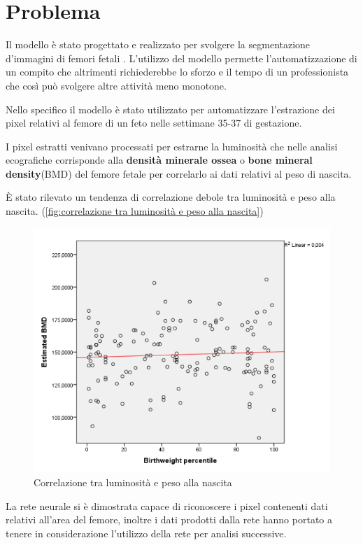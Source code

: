 
\section{Problema} %
\label{sec:Problema}

Il modello è stato progettato e realizzato per svolgere la segmentazione d'immagini di femori fetali \cite{abstract1} \cite{abstract2} .
L'utilizzo del modello permette l'automatizzazione di un compito che altrimenti richiederebbe lo sforzo e il tempo di un 
professionista che così può svolgere altre attività meno monotone.

Nello specifico il modello è stato utilizzato per automatizzare l'estrazione dei pixel relativi al femore di un feto 
nelle settimane 35-37 di gestazione. 

I pixel estratti venivano processati per estrarne la luminosità che nelle analisi ecografiche corrisponde 
alla \textbf{densità minerale ossea} o \textbf{bone mineral density}(BMD) del femore fetale
per correlarlo ai dati relativi al peso di nascita.

È stato rilevato un tendenza di correlazione debole tra luminosit\`a e peso alla nascita. (\autoref{fig:correlazione tra luminosità e peso alla nascita})

\begin{figure}[H]
    \centering
    \includegraphics[width=0.7\columnwidth]{Immagini/correlation_weight_abstract.png}
    \caption{Correlazione tra luminosità e peso alla nascita}
    \label{fig:correlazione tra luminosità e peso alla nascita}
\end{figure}


La rete neurale si è dimostrata capace di riconoscere i pixel contenenti dati relativi all'area del femore, inoltre i dati prodotti dalla rete hanno portato a tenere in considerazione 
l'utilizzo della rete per analisi successive.



